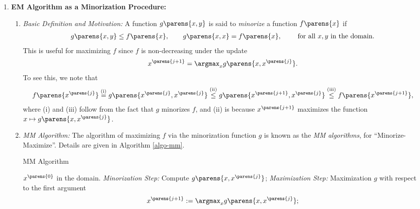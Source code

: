 \documentclass[12pt]{article}
\begin{document}
\begin{enumerate}[label=\textbf{\arabic*.}]
	\item \textbf{EM Algorithm as a Minorization Procedure:} 
	\begin{enumerate}
		\item \textit{Basic Definition and Motivation:} A function $g \parens{x, y}$ is said to \textit{minorize} a function $f \parens{x}$ if 
		\begin{align*}
			g \parens{x, y} \le f \parens{x}, \qquad g \parens{x, x} = f \parens{x}, \qquad \text{ for all } x, y \text{ in the domain}. 
		\end{align*}
		This is useful for maximizing $f$ since $f$ is non-decreasing under the update 
		\begin{align*}
			x^{\parens{j+1}} = \argmax_x g \parens{x, x^{\parens{j}}}. 
		\end{align*}
		To see this, we note that 
		\begin{align*}
			f \parens{x^{\parens{j}}} \stackrel{\mathrm{(i)}}{=} g \parens{x^{\parens{j}}, x^{\parens{j}}} \stackrel{\mathrm{(ii)}}{\le} g \parens{x^{\parens{j+1}}, x^{\parens{j}}} \stackrel{\mathrm{(iii)}}{\le} f \parens{x^{\parens{j+1}}}, 
		\end{align*}
		where (i) and (iii) follow from the fact that $g$ minorizes $f$, and (ii) is because $x^{\parens{j+1}}$ maximizes the function $x \mapsto g \parens{x, x^{\parens{j}}}$. 
		
		\item \textit{MM Algorithm:} The algorithm of maximizing $f$ via the minorization function $g$ is known as the \textit{MM algorithms}, for ``Minorize-Maximize''. Details are given in Algorithm \ref{algo-mm}. 
		
		\begin{minipage}{\linewidth}
			\begin{algorithm}[H]
				\caption{MM Algorithm}\label{algo-mm}
				\begin{algorithmic}[1]
					\REQUIRE $x^{\parens{0}}$ in the domain. 
					\STATE \textit{Minorization Step:} Compute $g \parens{x, x^{\parens{j}}}$; 
					\STATE \textit{Maximization Step:} Maximization $g$ with respect to the first argument 
					\begin{align*}
						x^{\parens{j+1}} := \argmax_x g \parens{x, x^{\parens{j}}}; 
					\end{align*}
					\ENDFOR
				\end{algorithmic}
			\end{algorithm}
		\end{minipage}


\end{enumerate}
\end{enumerate}
\end{document}

